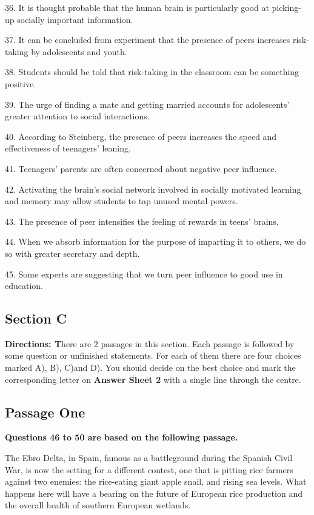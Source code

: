 \documentclass[UTF8,11pt]{ctexart}
\begin{document}
36. It is thought probable that the human brain is particularly good at picking-up socially important information.


37. It can be concluded from experiment that the presence of peers increases risk-taking by adolescents and youth.


38. Students should be told that risk-taking in the classroom can be something positive.


39. The urge of finding a mate and getting married accounts for adolescents’ greater attention to social interactions.


40. According to Steinberg, the presence of peers increases the speed and effectiveness of teenagers’ leaning.


41. Teenagers’ parents are often concerned about negative peer influence.


42. Activating the brain’s social network involved in socially motivated learning and memory may allow students to tap unused mental powers.


43. The presence of peer intensifies the feeling of rewards in teens’ brains.


44. When we absorb information for the purpose of imparting it to others, we do so with greater secretary and depth.


45. Some experts are suggesting that we turn peer influence to good use in education.


\subsection*{\textbf{Section C}}


\textbf{Directions: T}here are 2 passages in this section. Each passage is followed by some question or unfinished statements. For each of them there are four choices marked A), B), C)and D). You should decide on the best choice and mark the corresponding letter on\textbf{ Answer Sheet 2} with a single line through the centre.


\subsection*{\textbf{Passage One}}


\textbf{Questions 46 to 50 are based on the following passage.}


The Ebro Delta, in Spain, famous as a battleground during the Spanish Civil War, is now the setting for a different contest, one that is pitting rice farmers against two enemies: the rice-eating giant apple snail, and rising sea levels. What happens here will have a bearing on the future of European rice production and the overall health of southern European wetlands.
\end{document}
